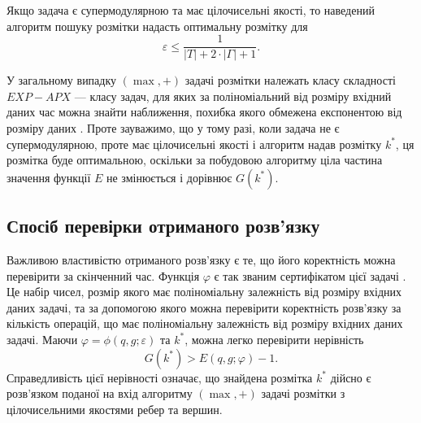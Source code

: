 Якщо задача є супермодулярною та має цілочисельні якості, то наведений алгоритм пошуку розмітки надасть
оптимальну розмітку для 
\begin{equation*}
    \varepsilon \leq \frac{1}{|T|+2\cdot|\Gamma|+1}.
\end{equation*}

У загальному випадку $(\max,+)$ задачі розмітки належать класу складності 
$EXP-APX$ --- класу задач, для яких за поліноміальний від розміру вхідний даних час 
можна знайти наближення, похибка якого обмежена експонентою від розміру даних \cite{li2016complexity}.
Проте зауважимо, що у тому разі, коли задача не є супермодулярною, проте має цілочисельні якості і алгоритм надав
розмітку $k^*$, ця розмітка буде оптимальною, оскільки за побудовою алгоритму ціла частина
значення функції $E$ не змінюється і дорівнює $G(k^*)$.

\subsection{Спосіб перевірки отриманого розв'язку}

Важливою властивістю отриманого розв’язку є те, що його коректність можна
перевірити за скінченний час. Функція $\varphi$ є так званим сертифікатом цієї задачі \cite{complexity}.
Це набір чисел, розмір якого має поліноміальну залежність від розміру вхідних даних
задачі, та за допомогою якого можна перевірити коректність розв’язку за кількість
операцій, що має поліноміальну залежність від розміру вхідних даних задачі. 
Маючи $\varphi=\phi(q,g;\varepsilon)$ та $k^*$, можна легко перевірити нерівність
\begin{equation*}
    G(k^*)>E(q,g;\varphi)-1.
\end{equation*}
Справедливість цієї нерівності означає, що знайдена розмітка $k^*$ дійсно є розв’язком
поданої на вхід алгоритму $(\max,+)$ задачі розмітки з цілочисельними якостями ребер та
вершин.
